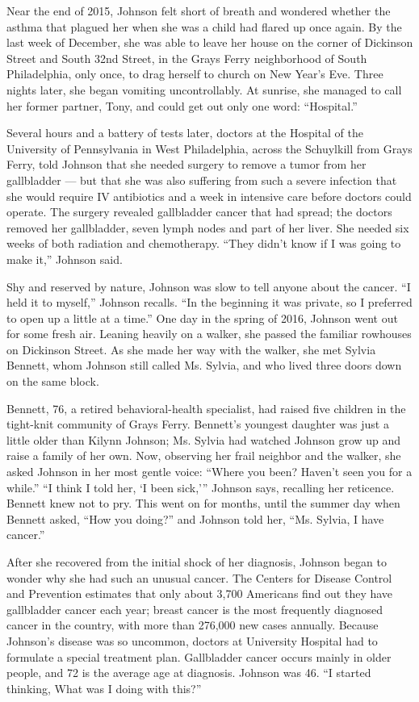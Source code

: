Near the end of 2015, Johnson felt short of breath and wondered whether
the asthma that plagued her when she was a child had flared up once
again. By the last week of December, she was able to leave her house on
the corner of Dickinson Street and South 32nd Street, in the Grays Ferry
neighborhood of South Philadelphia, only once, to drag herself to church
on New Year's Eve. Three nights later, she began vomiting
uncontrollably. At sunrise, she managed to call her former partner,
Tony, and could get out only one word: ``Hospital.''

Several hours and a battery of tests later, doctors at the Hospital of
the University of Pennsylvania in West Philadelphia, across the
Schuylkill from Grays Ferry, told Johnson that she needed surgery to
remove a tumor from her gallbladder --- but that she was also suffering
from such a severe infection that she would require IV antibiotics and a
week in intensive care before doctors could operate. The surgery
revealed gallbladder cancer that had spread; the doctors removed her
gallbladder, seven lymph nodes and part of her liver. She needed six
weeks of both radiation and chemotherapy. ``They didn't know if I was
going to make it,'' Johnson said.

Shy and reserved by nature, Johnson was slow to tell anyone about the
cancer. ``I held it to myself,'' Johnson recalls. ``In the beginning it
was private, so I preferred to open up a little at a time.'' One day in
the spring of 2016, Johnson went out for some fresh air. Leaning heavily
on a walker, she passed the familiar rowhouses on Dickinson Street. As
she made her way with the walker, she met Sylvia Bennett, whom Johnson
still called Ms. Sylvia, and who lived three doors down on the same
block.

Bennett, 76, a retired behavioral-health specialist, had raised five
children in the tight-knit community of Grays Ferry. Bennett's youngest
daughter was just a little older than Kilynn Johnson; Ms. Sylvia had
watched Johnson grow up and raise a family of her own. Now, observing
her frail neighbor and the walker, she asked Johnson in her most gentle
voice: ``Where you been? Haven't seen you for a while.'' ``I think I
told her, `I been sick,''' Johnson says, recalling her reticence.
Bennett knew not to pry. This went on for months, until the summer day
when Bennett asked, ``How you doing?'' and Johnson told her, ``Ms.
Sylvia, I have cancer.''

After she recovered from the initial shock of her diagnosis, Johnson
began to wonder why she had such an unusual cancer. The Centers for
Disease Control and Prevention estimates that only about 3,700 Americans
find out they have gallbladder cancer each year; breast cancer is the
most frequently diagnosed cancer in the country, with more than 276,000
new cases annually. Because Johnson's disease was so uncommon, doctors
at University Hospital had to formulate a special treatment plan.
Gallbladder cancer occurs mainly in older people, and 72 is the average
age at diagnosis. Johnson was 46. ``I started thinking, What was I doing
with this?''

